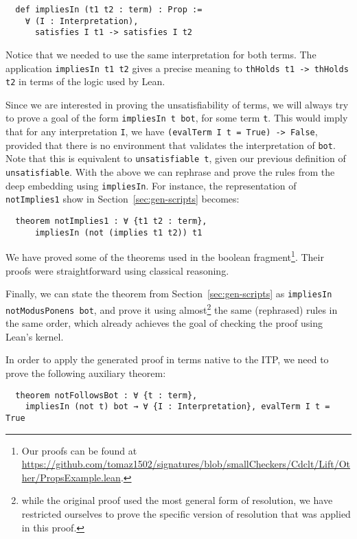 \begin{verbatim}
  def impliesIn (t1 t2 : term) : Prop :=
    ∀ (I : Interpretation),
      satisfies I t1 -> satisfies I t2
\end{verbatim}

Notice that we needed to use the same interpretation for both terms.
%
The application \texttt{impliesIn t1 t2} gives a precise meaning to \texttt{thHolds t1 -> thHolds t2} in terms of the logic used by Lean.

Since we are interested in proving the unsatisfiability of terms, we will always try to prove a goal of the form \texttt{impliesIn t bot}, for some term \texttt{t}. This would imply that for any interpretation \texttt{I}, we have \texttt{(evalTerm I t = True) -> False}, provided that there is no environment that validates the interpretation of \texttt{bot}. Note that this is equivalent to \texttt{unsatisfiable t}, given our previous definition of \texttt{unsatisfiable}.
With the above we can rephrase and prove the rules from the deep embedding using
\texttt{impliesIn}.
%
For instance, the representation of \texttt{notImplies1} show in Section~\ref{sec:gen-scripts} becomes:

\begin{verbatim}
  theorem notImplies1 : ∀ {t1 t2 : term},
      impliesIn (not (implies t1 t2)) t1
\end{verbatim}

We have proved some of the theorems used in the boolean fragment\footnote{Our proofs can be found at \url{https://github.com/tomaz1502/signatures/blob/smallCheckers/Cdclt/Lift/Other/PropsExample.lean}.}. Their proofs
were straightforward using classical reasoning.

Finally, we can state the theorem from Section~\ref{sec:gen-scripts} as
\texttt{impliesIn notModusPonens bot}, and prove it using almost\footnote{while the original proof used the most general form of resolution, we have restricted ourselves to prove the specific version of resolution that was applied in this proof.} the same
(rephrased) rules in the same order, which already achieves the goal
of checking the proof using Lean's kernel.

In order to apply the generated proof in terms native to the ITP, we need
to prove the following auxiliary theorem:

\begin{verbatim}
  theorem notFollowsBot : ∀ {t : term},
    impliesIn (not t) bot → ∀ {I : Interpretation}, evalTerm I t = True
\end{verbatim}

